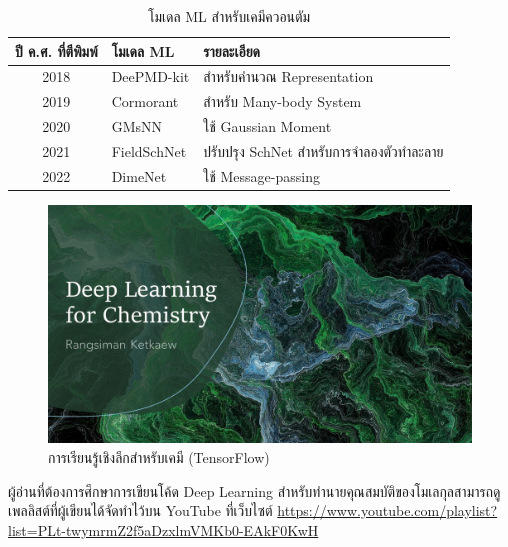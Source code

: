 \begin{table}[H]
    \centering
    \caption{โมเดล ML สำหรับเคมีควอนตัม}
    \label{tab:ml_qm_model}
    \begin{tabular}{cll}
        \toprule
        \textbf{ปี ค.ศ. ที่ตีพิมพ์} & \textbf{โมเดล ML}                   & \textbf{รายละเอียด}                \\
        \midrule
        2018                  & DeePMD-kit\autocite{wang2018}       & สำหรับคำนวณ Representation           \\
        2019                  & Cormorant\autocite{anderson2019}    & สำหรับ Many-body System             \\
        2020                  & GMsNN\autocite{zaverkin2020}        & ใช้ Gaussian Moment                \\
        2021                  & FieldSchNet\autocite{gastegger2021} & ปรับปรุง SchNet สำหรับการจำลองตัวทำละลาย \\
        2022                  & DimeNet\autocite{gasteiger2022}     & ใช้ Message-passing                \\
        \bottomrule
    \end{tabular}
\end{table}

\begin{figure}[H]
    \centering
    \includegraphics[width=0.8\linewidth]{fig/youtube_dl_chem.jpg}
    \caption{การเรียนรู้เชิงลึกสำหรับเคมี (TensorFlow)}
    \label{fig:yt_dl_chem}
\end{figure}

ผู้อ่านที่ต้องการศึกษาการเขียนโค้ด Deep Learning สำหรับทำนายคุณสมบัติของโมเลกุลสามารถดูเพลลิสต์ที่ผู้เขียนได้จัดทำไว้บน YouTube ที่เว็บไซต์ \url{https://www.youtube.com/playlist?list=PLt-twymrmZ2f5aDzxlmVMKb0-EAkF0KwH}
